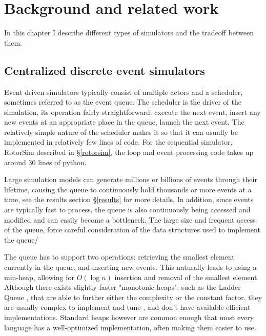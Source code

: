 \chapter{Background and related work} \label{background}

In this chapter I describe different types of simulators and the tradeoff between them.

\section{Centralized discrete event simulators} \label{centralized-sim}

Event driven simulators typically consist of multiple actors and a scheduler, sometimes referred to as the event queue. %
The scheduler is the driver of the simulation, its operation fairly straightforward: execute the next event, insert any new events at an appropriate place in the queue, launch the next event.
The relatively simple nature of the scheduler makes it so that it can usually be implemented in relatively few lines of code.
For the sequential simulator, RotorSim\cite{brode-roger_nibriviarotorsim_2020} described in \S \ref{rotorsim}, the loop and event processing code takes up around 30 lines of python.

Large simulation models can generate millions or billions of events through their lifetime, causing the queue to continuously hold thousands or more events at a time, see the results section \S\ref{results} for more details.
In addition, since events are typically fast to process, the queue is also continuously being accessed and modified and can easily become a bottleneck.
The large size and frequent access of the queue, force careful consideration of the data structures used to implement the queue/

The queue has to support two operations: retrieving the smallest element currently in the queue, and inserting new events.
This naturally leads to using a min-heap, allowing for $O\left(\log n\right)$ insertion and removal of the smallest element.
Although there exists slightly faster "monotonic heaps", such as the Ladder Queue \cite{tang_ladder_2005}, that are able to further either the complexity or the constant factor, they are usually complex to implement and tune \cite{furfaro_adaptive_2018}, and don't have available efficient implementations.
Standard heaps however are common enough that most every language has a well-optimized implementation, often making them easier to use.

